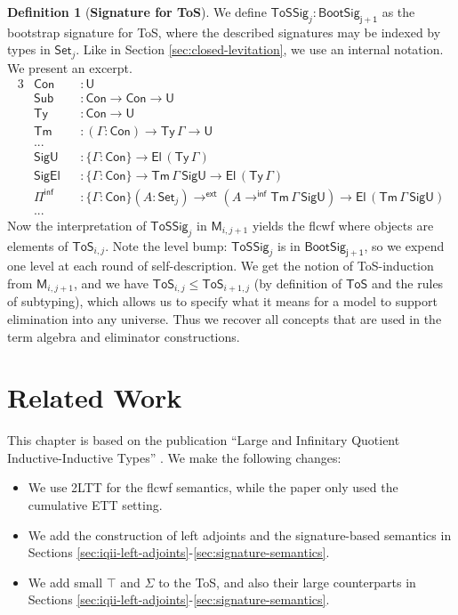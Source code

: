 \documentclass[12pt,a4paper,twoside,openany]{book}
\theoremstyle{remark}
\theoremstyle{definition}
\newtheorem{mydefinition}{Definition}
\theoremstyle{theorem}
\newcommand{\ms}[1]{\mathsf{#1}}
\newcommand{\bs}[1]{\boldsymbol{#1}}
\newcommand{\Con}{\mathsf{Con}}
\newcommand{\Sub}{\mathsf{Sub}}
\newcommand{\Tm}{\mathsf{Tm}}
\newcommand{\Ty}{\mathsf{Ty}}
\newcommand{\U}{\mathsf{U}}
\newcommand{\El}{\mathsf{El}}
\newcommand{\Set}{\mathsf{Set}}
\newcommand{\ToS}{\mathsf{ToS}}
\newcommand{\toe}{\to^{\ms{ext}}}
\newcommand{\Piinf}{\Pi^{\mathsf{inf}}}
\newcommand{\ToSSig}{\mathsf{ToSSig}}
\newcommand{\toinf}{\to^{\ms{inf}}}
\newcommand{\bM}{\bs{\mathsf{M}}}
\begin{document}
\begin{mydefinition}[\textbf{Signature for ToS}]
We define $\ToSSig_j : \ms{BootSig_{j+1}}$ as the bootstrap signature for ToS, where the
described signatures may be indexed by types in $\Set_j$. Like in Section
\ref{sec:closed-levitation}, we use an internal notation. We present an excerpt.
\begingroup
\allowdisplaybreaks
\begin{alignat*}{3}
  & \Con       &&: \U\\
  & \Sub       &&: \Con \to \Con \to \U\\
  & \Ty        &&: \Con \to \U\\
  & \Tm        &&: (\Gamma : \Con) \to \Ty\,\Gamma \to \U\\
  & ...        &&\\
  & \ms{SigU}  &&: \{\Gamma : \Con\} \to \El\,(\Ty\,\Gamma)\\
  & \ms{SigEl} &&: \{\Gamma : \Con\} \to \Tm\,\Gamma\,\ms{SigU} \to \El\,(\Ty\,\Gamma)\\
  & \Piinf     &&: \{\Gamma : \Con\}(A : \Set_j) \toe (A \toinf \Tm\,\Gamma\,\ms{SigU}) \to \El\,(\Tm\,\Gamma\,\ms{SigU})\\
  & ...        &&
\end{alignat*}
Now the interpretation of $\ToSSig_j$ in $\bM_{i,j+1}$ yields the flcwf where
objects are elements of $\ToS_{i,j}$. Note the level bump: $\ToSSig_j$ is in
$\ms{BootSig_{j+1}}$, so we expend one level at each round of self-description.
We get the notion of ToS-induction from $\bM_{i,j+1}$, and we have $\ToS_{i,j}
\leq \ToS_{i+1,j}$ (by definition of $\ToS$ and the rules of subtyping), which
allows us to specify what it means for a model to support elimination into any
universe. Thus we recover all concepts that are used in the term algebra and
eliminator constructions.
\end{mydefinition}
\endgroup


\section{Related Work}
\label{sec:iqii-related-work}

This chapter is based on the publication ``Large and Infinitary Quotient
Inductive-Inductive Types'' \cite{iqiit}. We make the following changes:
\begin{itemize}
  \item We use 2LTT for the flcwf semantics, while the paper only used the cumulative
        ETT setting.
  \item We add the construction of left adjoints and the signature-based semantics in
        Sections \ref{sec:iqii-left-adjoints}-\ref{sec:signature-semantics}.
  \item We add small $\top$ and $\Sigma$ to the ToS, and also their large counterparts
        in Sections \ref{sec:iqii-left-adjoints}-\ref{sec:signature-semantics}.
\end{itemize}
\end{document}
